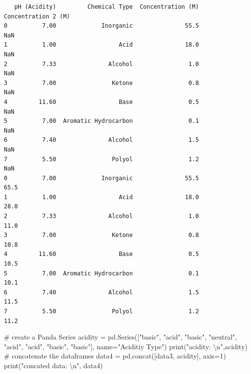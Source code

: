\documentclass[
  letterpaper,
  DIV=11,
  numbers=noendperiod]{scrreprt}
\newenvironment{Shaded}{\begin{snugshade}}{\end{snugshade}}
\newcommand{\BuiltInTok}[1]{\textcolor[rgb]{0.00,0.23,0.31}{#1}}
\newcommand{\CharTok}[1]{\textcolor[rgb]{0.13,0.47,0.30}{#1}}
\newcommand{\CommentTok}[1]{\textcolor[rgb]{0.37,0.37,0.37}{#1}}
\newcommand{\DecValTok}[1]{\textcolor[rgb]{0.68,0.00,0.00}{#1}}
\newcommand{\NormalTok}[1]{\textcolor[rgb]{0.00,0.23,0.31}{#1}}
\newcommand{\OperatorTok}[1]{\textcolor[rgb]{0.37,0.37,0.37}{#1}}
\newcommand{\StringTok}[1]{\textcolor[rgb]{0.13,0.47,0.30}{#1}}
\begin{document}
\begin{verbatim}
   pH (Acidity)         Chemical Type  Concentration (M)  Concentration 2 (M)  
0          7.00             Inorganic               55.5                  NaN  
1          1.00                  Acid               18.0                  NaN  
2          7.33               Alcohol                1.0                  NaN  
3          7.00                Ketone                0.8                  NaN  
4         11.60                  Base                0.5                  NaN  
5          7.00  Aromatic Hydrocarbon                0.1                  NaN  
6          7.40               Alcohol                1.5                  NaN  
7          5.50                Polyol                1.2                  NaN  
0          7.00             Inorganic               55.5                 65.5  
1          1.00                  Acid               18.0                 28.0  
2          7.33               Alcohol                1.0                 11.0  
3          7.00                Ketone                0.8                 10.8  
4         11.60                  Base                0.5                 10.5  
5          7.00  Aromatic Hydrocarbon                0.1                 10.1  
6          7.40               Alcohol                1.5                 11.5  
7          5.50                Polyol                1.2                 11.2  
\end{verbatim}

\begin{Shaded}
\begin{Highlighting}[]
 \CommentTok{\# create a Panda Series}
\NormalTok{acidity }\OperatorTok{=}\NormalTok{ pd.Series([}\StringTok{"basic"}\NormalTok{, }\StringTok{"acid"}\NormalTok{, }\StringTok{"basic"}\NormalTok{, }\StringTok{"neutral"}\NormalTok{,}
                    \StringTok{"acid"}\NormalTok{, }\StringTok{"acid"}\NormalTok{, }\StringTok{"basic"}\NormalTok{, }\StringTok{"basic"}\NormalTok{], name}\OperatorTok{=}\StringTok{"Aciditiy Type"}\NormalTok{)}
\BuiltInTok{print}\NormalTok{(}\StringTok{"acidity: }\CharTok{\textbackslash{}n}\StringTok{"}\NormalTok{,acidity)}
\CommentTok{\# concatenate the dataframes}
\NormalTok{data4 }\OperatorTok{=}\NormalTok{ pd.concat([data3, acidity], axis}\OperatorTok{=}\DecValTok{1}\NormalTok{) }
\BuiltInTok{print}\NormalTok{(}\StringTok{"concated data: }\CharTok{\textbackslash{}n}\StringTok{"}\NormalTok{, data4)}
\end{Highlighting}
\end{Shaded}
\end{document}
